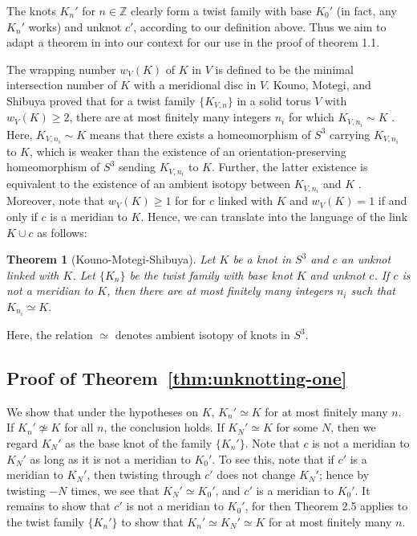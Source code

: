 \documentclass[11pt,usenames,dvipsnames,reqno]{amsart}
\newtheorem{theorem}{Theorem}
\numberwithin{theorem}{section}
\theoremstyle{ex}
\theoremstyle{rem}
\begin{document}
The knots $K_n'$ for $n \in \mathbb{Z}$ clearly form a twist family with base $K_0'$ (in fact, any $K_n'$ works) and unknot $c'$, according to our definition above. Thus we aim to adapt a theorem in \cite{twisting-knot-types} into our context for our use in the proof of theorem 1.1. 

The wrapping number $w_V(K)$ of $K$ in $V$ is defined to be the minimal intersection number of $K$ with a meridional disc in $V$. 
Kouno, Motegi, and Shibuya proved that for a twist family $\{K_{V,n}\}$ in a solid torus $V$ with $w_V(K)\geq 2$, there are at most finitely many integers $n_i$ for which $K_{V,n_i}\sim K$  \cite[Theorem 3.2]{twisting-knot-types}. Here, $K_{V,n_i}\sim K$ means that there exists a homeomorphism of $S^3$ carrying $K_{V,n_i}$ to $K$, which is weaker than the existence of an orientation-preserving homeomorphism of $S^3$ sending $K_{V,n_i}$ to $K$. Further, the latter existence is equivalent to the existence of an ambient isotopy between $K_{V,n_i}$ and $K$ \cite[Introduction]{twisting-knot-types}. Moreover, note that $w_V(K)\geq 1$ for for $c$ linked with $K$ and $w_V(K)=1$ if and only if $c$ is a meridian to $K$. Hence, we can translate \cite[Theorem 3.2]{twisting-knot-types} into the language of the link $K\cup c$ as follows:


\begin{theorem}[Kouno-Motegi-Shibuya] Let $K$ be a knot in $S^3$ and $c$ an unknot linked with $K$. Let $\{K_n\}$ be the twist family with base knot $K$ and unknot $c$. If $c$ is not a meridian to $K$, then there are at most finitely many integers $n_i$ such that $K_{n_i}\simeq K$. 
\end{theorem}

Here, the relation $\simeq$ denotes ambient isotopy of knots in $S^3$.

\subsection{Proof of Theorem~\ref{thm:unknotting-one}} We show that under the hypotheses on $K$, $K_n'\simeq K$ for at most finitely many $n$. If $K_n'\not\simeq K$ for all $n$, the conclusion holds. If $K_N'\simeq K$ for some $N$, then we regard $K_N'$ as the base knot of the family $\{K_n'\}$. Note that $c$ is not a meridian to $K_N'$ as long as it is not a meridian to $K_0'$. To see this, note that if $c'$ is a meridian to $K_N'$, then twisting through $c'$ does not change $K_N'$; hence by twisting $-N$ times, we see that $K_N'\simeq K_0'$, and $c'$ is a meridian to $K_0'$. It remains to show that $c'$ is not a meridian to $K_0'$, for then Theorem 2.5 applies to the twist family $\{K_n'\}$ to show that $K_n'\simeq K_N'\simeq K$ for at most finitely many $n$. 
\end{document}
